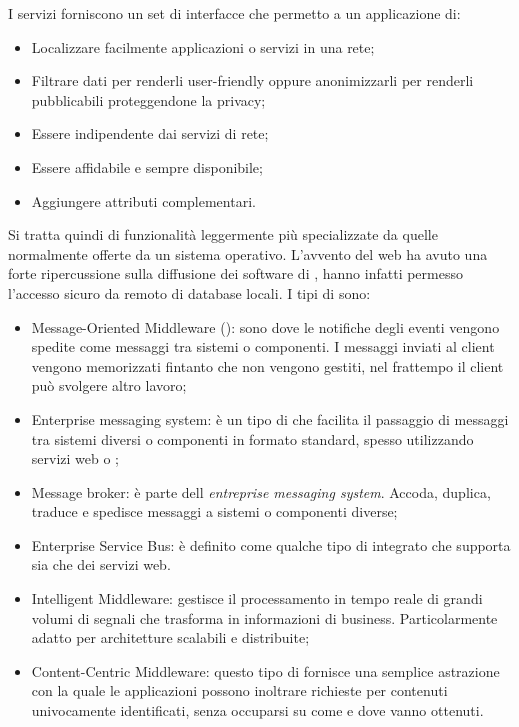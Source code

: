 	I servizi  forniscono un set di interfacce che permetto a un applicazione di:
	
	\begin{itemize}
		\item Localizzare facilmente applicazioni o servizi in una rete;
		\item Filtrare dati per renderli user-friendly oppure anonimizzarli per renderli pubblicabili proteggendone la privacy;
		\item Essere indipendente dai servizi di rete;
		\item Essere affidabile e sempre disponibile;
		\item Aggiungere attributi complementari.
	\end{itemize}
	
	Si tratta quindi di funzionalità leggermente più specializzate da quelle normalmente offerte da un sistema operativo. 
	L'avvento del web ha avuto una forte ripercussione sulla diffusione dei software di , hanno infatti permesso l'accesso sicuro da remoto di database locali.
	I tipi di  sono:
	
	\begin{itemize}
		\item Message-Oriented Middleware (): sono  dove le notifiche degli eventi vengono spedite come messaggi tra sistemi o componenti. I messaggi inviati al client vengono memorizzati fintanto che non vengono gestiti, nel frattempo il client può svolgere altro lavoro;
		\item Enterprise messaging system: è un tipo di  che facilita il passaggio di messaggi tra sistemi diversi o componenti in formato standard, spesso utilizzando servizi web o ;
		\item Message broker: è parte dell \emph{entreprise messaging system}. Accoda, duplica, traduce e spedisce messaggi a sistemi o componenti diverse;
		\item Enterprise Service Bus: è definito come qualche tipo di  integrato che supporta sia  che dei servizi web.
		\item Intelligent Middleware: gestisce il processamento in tempo reale di grandi volumi di segnali che trasforma in informazioni di business. Particolarmente adatto per architetture scalabili e distribuite;
		\item Content-Centric Middleware: questo tipo di  fornisce una semplice astrazione con la quale le applicazioni possono inoltrare richieste per contenuti univocamente identificati, senza occuparsi su come e dove vanno ottenuti.
	\end{itemize}	 
	
